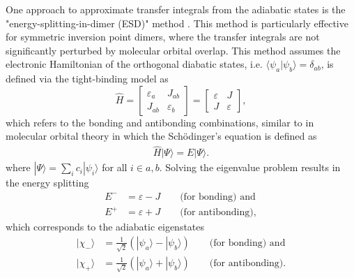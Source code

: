 One approach to approximate transfer integrals from the adiabatic states is the "energy-splitting-in-dimer (ESD)" method \cite{Coropceanu2007,Lemaur2004,Hutchison2005}. 
This method is particularly effective for symmetric inversion point dimers, where the transfer integrals are not significantly perturbed by molecular orbital overlap.
This method assumes the electronic Hamiltonian of the orthogonal diabatic states, i.e. $\langle \psi_a | \psi_b \rangle = \delta_{ab}$, is defined via the tight-binding model as 
\begin{equation} \label{equ:2.89}
    \hat{H} = 
    \begin{bmatrix}
        \varepsilon_{a}  &  J_{ab}\\
        J_{ab} & \varepsilon_{b}
    \end{bmatrix}
    =
    \begin{bmatrix}
        \varepsilon  &  J\\
        J & \varepsilon
    \end{bmatrix},
\end{equation}
which refers to the bonding and antibonding combinations, similar to in molecular orbital theory in which the Sch\"{o}dinger's equation is defined as
\begin{equation} \label{equ:2.90}
\begin{split}
\hat{H}|\Psi\rangle = E|\Psi\rangle.
\end{split}
\end{equation}
where $|\Psi\rangle = \sum_{i} c_{i}|\psi_{i}\rangle$ for all $i\in a,b$.
Solving the eigenvalue problem results in the energy splitting
\begin{subequations}
\begin{align}
    \label{equ:2.91a} E^{-} &= \varepsilon - J \quad\quad \text{(for bonding) and}\\
    \label{equ:2.91b} E^{+} &= \varepsilon + J \quad\quad \text{(for antibonding)},
\end{align}
\end{subequations}
which corresponds to the adiabatic eigenstates  
\begin{subequations}
\begin{align}
\label{equ:2.92a}
    |\chi_{-}\rangle &= \frac{1}{\sqrt{2}} 
    (|\psi_a\rangle - |\psi_b\rangle)
    \quad\quad \text{(for bonding) and}\\
\label{equ:2.92b}    
    |\chi_{+}\rangle &= \frac{1}{\sqrt{2}}
        (|\psi_a\rangle + |\psi_b\rangle)
    \quad\quad \text{(for antibonding)}.
\end{align}
\end{subequations}
